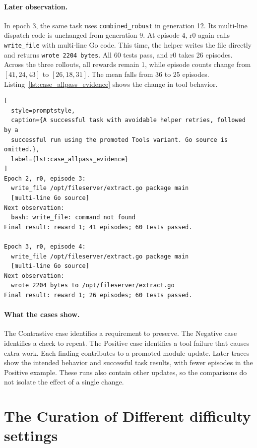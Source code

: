 \documentclass{article} %
\begin{document}
\paragraph{Later observation.}
In epoch 3, the same task uses \texttt{combined\_robust} in generation 12.
Its multi-line dispatch code is unchanged from generation 9.
At episode 4, r0 again calls \texttt{write\_file} with multi-line Go code.
This time, the helper writes the file directly and returns
\texttt{wrote 2204 bytes}. All 60 tests pass, and r0 takes 26 episodes.
Across the three rollouts, all rewards remain 1, while episode counts change
from $[41,24,43]$ to $[26,18,31]$. The mean falls from 36 to 25 episodes.
Listing~\ref{lst:case_allpass_evidence} shows the change in tool behavior.

\begin{lstlisting}[
  style=promptstyle,
  caption={A successful task with avoidable helper retries, followed by a
  successful run using the promoted Tools variant. Go source is omitted.},
  label={lst:case_allpass_evidence}
]
Epoch 2, r0, episode 3:
  write_file /opt/fileserver/extract.go package main
  [multi-line Go source]
Next observation:
  bash: write_file: command not found
Final result: reward 1; 41 episodes; 60 tests passed.

Epoch 3, r0, episode 4:
  write_file /opt/fileserver/extract.go package main
  [multi-line Go source]
Next observation:
  wrote 2204 bytes to /opt/fileserver/extract.go
Final result: reward 1; 26 episodes; 60 tests passed.
\end{lstlisting}

\paragraph{What the cases show.}
The Contrastive case identifies a requirement to preserve.
The Negative case identifies a check to repeat.
The Positive case identifies a tool failure that causes extra work.
Each finding contributes to a promoted module update.
Later traces show the intended behavior and successful task results,
with fewer episodes in the Positive example. These runs also contain other
updates, so the comparisons do not isolate the effect of a single change.




\section{The Curation of Different difficulty settings}
\label{appendix:difficulty_setting}
\end{document}
